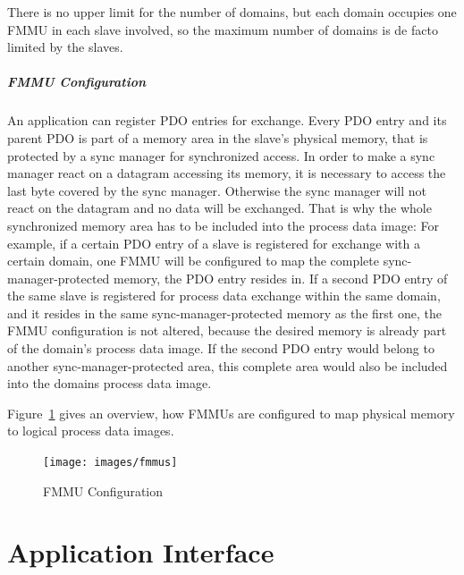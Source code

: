 \documentclass[a4paper,12pt,BCOR6mm,bibtotoc,idxtotoc]{scrbook}
\begin{document}
There is no upper limit for the number of domains, but each domain occupies
one FMMU in each slave involved, so the maximum number of domains is de facto
limited by the slaves.

\paragraph{FMMU Configuration}

An application can register PDO entries for exchange. Every PDO entry and its
parent PDO is part of a memory area in the slave's physical memory, that is
protected by a sync manager \cite[sec.~6.7]{dlspec} for synchronized access.
In order to make a sync manager react on a datagram accessing its memory, it
is necessary to access the last byte covered by the sync manager. Otherwise
the sync manager will not react on the datagram and no data will be exchanged.
That is why the whole synchronized memory area has to be included into the
process data image: For example, if a certain PDO entry of a slave is
registered for exchange with a certain domain, one FMMU will be configured to
map the complete sync-manager-protected memory, the PDO entry resides in. If a
second PDO entry of the same slave is registered for process data exchange
within the same domain, and it resides in the same sync-manager-protected
memory as the first one, the FMMU configuration is not altered, because the
desired memory is already part of the domain's process data image. If the
second PDO entry would belong to another sync-manager-protected area, this
complete area would also be included into the domains process data image.

Figure~\ref{fig:fmmus} gives an overview, how FMMUs are configured to map
physical memory to logical process data images.

\begin{figure}[htbp]
  \centering
  \texttt{[image: images/fmmus]}
  \caption{FMMU Configuration}
  \label{fig:fmmus}
\end{figure}


\chapter{Application Interface}
\label{chap:api}

%
\end{document}
